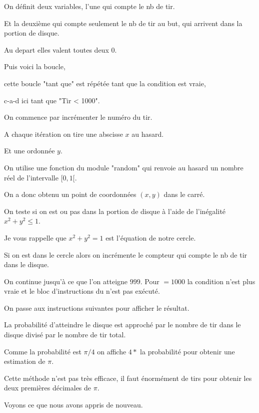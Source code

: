 On définit deux variables, l'une qui compte le nb de tir.

Et la deuxième qui compte seulement le nb de tir au but, qui arrivent dans la portion de disque.

Au depart elles valent toutes deux $0$.

\change

Puis voici la boucle, 

cette boucle "tant que" est répétée tant que la condition est vraie,

c-a-d ici tant que "Tir < 1000".


On commence par incrémenter le numéro du tir.

A chaque itération on tire une abscisse $x$ au hasard. 

Et une ordonnée $y$.

On utilise une fonction  du module "random" 
qui renvoie au hasard un nombre réel de l'intervalle $[0,1[$.


On a donc obtenu un point de coordonnées $(x,y)$ dans le carré.

On teste si on est ou pas dans la portion de disque 
à l'aide de l'inégalité $x^2+y^2 \le 1$.

Je vous rappelle que $x^2+y^2=1$ est l'équation de notre cercle.
 
Si on est dans le cercle alors on incrémente 
le compteur qui compte le nb de tir dans le disque.


\change

On continue 
  jusqu'à ce que l'on atteigne $999$. Pour $=1000$ la condition
  n'est plus vraie et le bloc d'instructions du  n'est pas exécuté. 
  
  On passe aux instructions suivantes
  pour afficher le résultat.
  
  La probabilité d'atteindre le disque est approché par le nombre de tir dans le disque divisé par le nombre de tir total.
  
  Comme la probabilité est $\pi/4$ on affiche $4*$ la probabilité pour obtenir une estimation de $\pi$.

Cette méthode n'est pas très efficace, 
il faut énormément de tirs pour obtenir les deux premières décimales de $\pi$.
  



\diapo
  
 Voyons ce que nous avons appris de nouveau.
 

